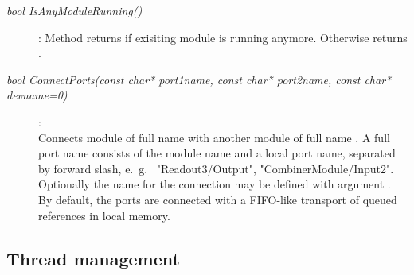 \begin{description}
\item[\em bool IsAnyModuleRunning()] :
Method returns  if  exisiting module is running anymore.
Otherwise returns .

\item[\em bool ConnectPorts\small (const char* port1name,
                           const char* port2name,
                           const char* devname=0)] :
 \\
Connects module  of full name 
with another  module  of full name .
A full port name consists of the module name and a local port name,
separated by forward slash, e.~g.~ "Readout3/Output", "CombinerModule/Input2".
Optionally the  name for the connection may
be defined with argument . By default, the ports are connected
with a FIFO-like transport of queued  references in local memory.			   
			   
\end{description}

\subsection{Thread management}	

\begin{description}
	   
\end{description}
	 
